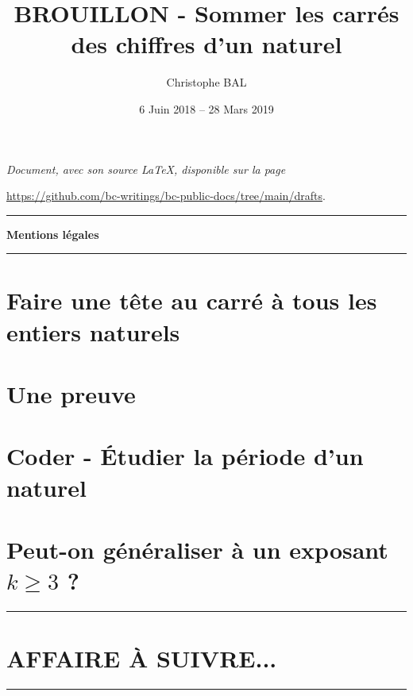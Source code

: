 \documentclass[12pt]{amsart}
\begin{document}
\title{BROUILLON - Sommer les carrés des chiffres d'un naturel}
\author{Christophe BAL}
\date{6 Juin 2018 -- 28 Mars 2019}

\maketitle

\begin{center}
    \itshape
    Document, avec son source \LaTeX, disponible sur la page

    \url{https://github.com/bc-writings/bc-public-docs/tree/main/drafts}.
\end{center}


\bigskip


\begin{center}
    \hrule\vspace{.3em}
    {
        \fontsize{1.35em}{1em}\selectfont
        \textbf{Mentions \og légales \fg}
    }

    \vspace{0.45em}
    \doclicenseThis
    \hrule
\end{center}


\bigskip
\setcounter{tocdepth}{1}
\tableofcontents



\section{Faire une tête au carré à tous les entiers naturels}

\label{conjecture}


\section{Une preuve}\label{proof}




\section{Coder - Étudier la \og période \fg{} d'un naturel}




\section{\texorpdfstring{Peut-on généraliser à un exposant $k \geqslant 3$ ?}%
                        {Peut-on généraliser à un exposant k >= 3 ?}}






\bigskip

\hrule

\section{AFFAIRE À SUIVRE...}

\bigskip

\hrule


%
%
\end{document}
